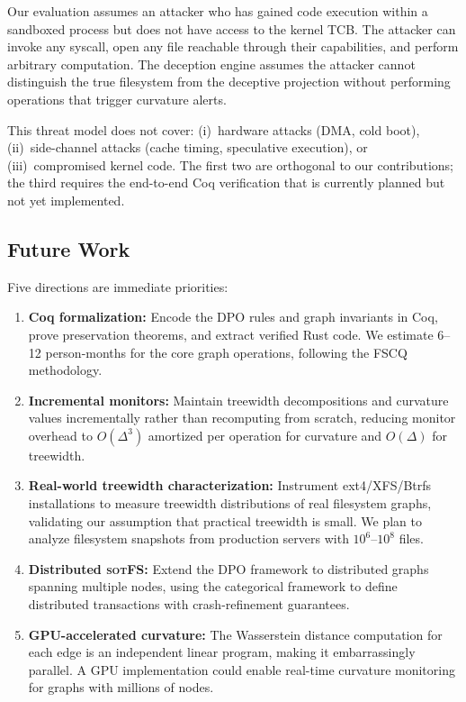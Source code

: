 \documentclass[11pt,a4paper]{article}
\theoremstyle{definition}
\theoremstyle{remark}
\newcommand{\sotfs}{\textsc{sotFS}}
\begin{document}
Our evaluation assumes an attacker who has gained code execution
within a sandboxed process but does not have access to the kernel
TCB. The attacker can invoke any syscall, open any file reachable
through their capabilities, and perform arbitrary computation. The
deception engine assumes the attacker cannot distinguish the true
filesystem from the deceptive projection without performing
operations that trigger curvature alerts.

This threat model does not cover: (i)~hardware attacks (DMA, cold
boot), (ii)~side-channel attacks (cache timing, speculative
execution), or (iii)~compromised kernel code. The first two are
orthogonal to our contributions; the third requires the end-to-end
Coq verification that is currently planned but not yet implemented.

\subsection{Future Work}
\label{sec:discussion-future}

Five directions are immediate priorities:

\begin{enumerate}
\item \textbf{Coq formalization:} Encode the DPO rules and graph
  invariants in Coq, prove preservation theorems, and extract
  verified Rust code. We estimate 6--12 person-months for the core
  graph operations, following the FSCQ methodology.

\item \textbf{Incremental monitors:} Maintain treewidth
  decompositions and curvature values incrementally rather than
  recomputing from scratch, reducing monitor overhead to $O(\Delta^3)$
  amortized per operation for curvature and $O(\Delta)$ for treewidth.

\item \textbf{Real-world treewidth characterization:} Instrument
  ext4/XFS/Btrfs installations to measure treewidth distributions
  of real filesystem graphs, validating our assumption that practical
  treewidth is small. We plan to analyze filesystem snapshots from
  production servers with $10^6$--$10^8$ files.

\item \textbf{Distributed \sotfs{}:} Extend the DPO framework to
  distributed graphs spanning multiple nodes, using the categorical
  framework to define distributed transactions with crash-refinement
  guarantees.

\item \textbf{GPU-accelerated curvature:} The Wasserstein distance
  computation for each edge is an independent linear program, making
  it embarrassingly parallel. A GPU implementation could enable
  real-time curvature monitoring for graphs with millions of nodes.
\end{enumerate}
\end{document}
